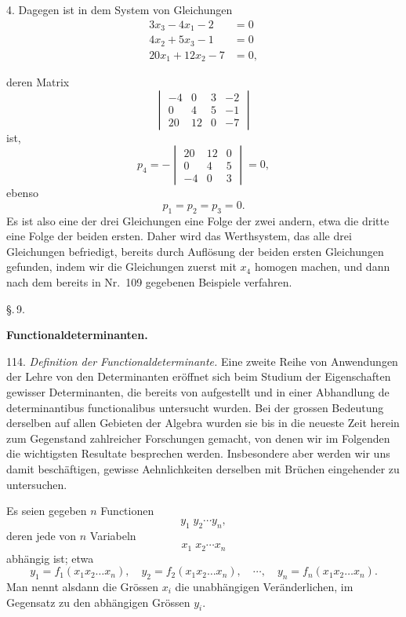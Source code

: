 \documentclass[11pt]{article}
\providecommand{\gesperrt}[1]{\textls[130]{#1}}
\providecommand{\weberpage}[1]{}
\begin{document}
4. Dagegen ist in dem System von Gleichungen
\[
\begin{aligned}
3x_3-4x_1-2&=0\\
4x_2+5x_3-1&=0\\
20x_1+12x_2-7&=0,
\end{aligned}
\]


\weberpage{120}
deren Matrix
\[
\begin{vmatrix}
-4 & 0 & 3 & -2\\
0 & 4 & 5 & -1\\
20 & 12 & 0 & -7
\end{vmatrix}
\]
ist,
\[
p_4=-\begin{vmatrix} 20 & 12 & 0\\ 0 & 4 & 5\\ -4 & 0 & 3 \end{vmatrix}=0,
\]
ebenso
\[
p_1=p_2=p_3=0.
\]
Es ist also eine der drei Gleichungen eine Folge der zwei andern, etwa die dritte eine Folge der beiden ersten. Daher wird das Werthsystem, das alle drei Gleichungen befriedigt, bereits durch Auflösung der beiden ersten Gleichungen gefunden, indem wir die Gleichungen zuerst mit $x_4$ homogen machen, und dann nach dem bereits in Nr.\ 109 gegebenen Beispiele verfahren.

\begin{center}
\S.\,9.

\textbf{Functionaldeterminanten.}
\end{center}

114. \textit{Definition der Functionaldeterminante.} Eine zweite Reihe von Anwendungen der Lehre von den Determinanten eröffnet sich beim Studium der Eigenschaften gewisser Determinanten, die bereits von \gesperrt{Jacobi} aufgestellt und in einer Abhandlung \glqq de determinantibus functionalibus\grqq{} untersucht wurden. Bei der grossen Bedeutung derselben auf allen Gebieten der Algebra wurden sie bis in die neueste Zeit herein zum Gegenstand zahlreicher Forschungen gemacht, von denen wir im Folgenden die wichtigsten Resultate besprechen werden. Insbesondere aber werden wir uns damit beschäftigen, gewisse Aehnlichkeiten derselben mit Brüchen eingehender zu untersuchen.

Es seien gegeben $n$ Functionen
\[
y_1\;y_2\cdots y_n,
\]
deren jede von $n$ Variabeln
\[
x_1\;x_2\cdots x_n
\]
abhängig ist; etwa
\[
y_1=f_1(x_1x_2\ldots x_n),\quad y_2=f_2(x_1x_2\ldots x_n),\quad\cdots,\quad y_n=f_n(x_1x_2\ldots x_n).
\]
Man nennt alsdann die Grössen $x_i$ die unabhängigen Veränderlichen, im Gegensatz zu den abhängigen Grössen $y_i$.
\end{document}
